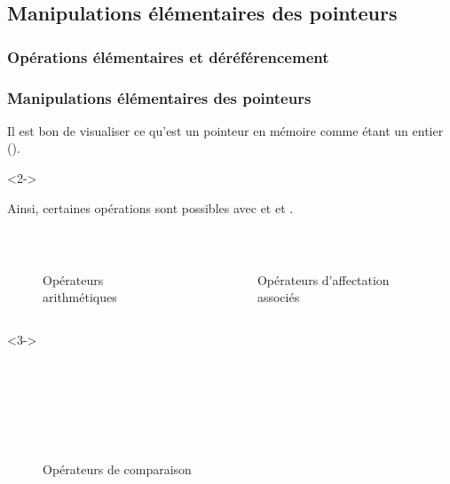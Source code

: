 \documentclass{cppcourses}
\begin{document}
\subsection{Manipulations élémentaires des pointeurs}

\subsubsection{Opérations élémentaires et déréférencement}

\begin{frame}

\frametitle{Manipulations élémentaires des pointeurs}

Il est bon de visualiser ce qu'est un pointeur en mémoire comme étant un entier ().

\begin{uncoverenv}<2->

Ainsi, certaines opérations sont possibles avec  et   et  .

\begin{columns}
    \begin{column}{0.5\textwidth}
        \begin{figure}
 \\
\caption{Opérateurs arithmétiques}
        \end{figure}
    \end{column}
    \begin{column}{0.5\textwidth}
        \begin{figure}
 \\
\caption{Opérateurs d'affectation associés}
        \end{figure}
    \end{column}
\end{columns}

\end{uncoverenv}

\begin{uncoverenv}<3->

\begin{figure}
 \\
 \\
 \\
 \\
 \\
\caption{Opérateurs de comparaison}
\end{figure}

\end{uncoverenv}

\end{frame}
\end{document}
